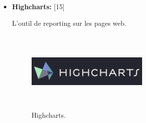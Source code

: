 \begin{itemize}
\item {  \textbf{ Highcharts:} } [15]


L'outil de \guillemotleft{} reporting \guillemotright{} sur les pages web.


\begin{figure}[H]
\center
\includegraphics[width=6cm,height=4cm]{./figures/teklogos/highcharts.png}
\caption{Highcharts.}
\end{figure}


\end{itemize}






















